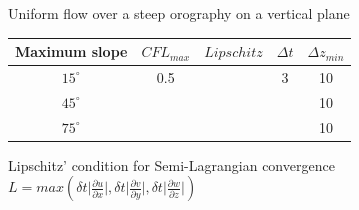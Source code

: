 \documentclass[10pt]{beamer}
\begin{document}


\begin{frame}{Uniform flow over a steep orography on a vertical plane}

    \begin{center}
        \begin{tabular}{|c|c|c|c|c|}
            \hline
              Maximum slope & $CFL_{max}$ & $Lipschitz$ & $\Delta t$ & $\Delta z_{min}$\\
            \hline
            $15^{\circ}$ & 0.5 &  &  3 &  10 \\
            \hline
            $45^{\circ}$ &  &  &  & 10 \\
            \hline
            $75^{\circ}$ &  &  &  & 10 \\
            \hline 
        \end{tabular}       
    \end{center}

    \begin{block}{Lipschitz' condition for Semi-Lagrangian convergence} 
        $L = max(\delta t \lvert \frac{\partial u}{\partial x} \rvert, \delta t \lvert \frac{\partial v}{\partial y} \rvert, \delta t \lvert \frac{\partial w}{\partial z} \rvert)$
    \end{block}

\end{frame}

\end{document}
